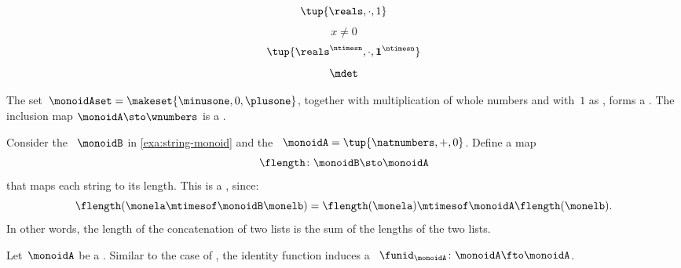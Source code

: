 {\begin{forslides}
\begin{equation}
        \end{equation}
        \begin{equation}
            \label{eq:reals-times-one}
            \tup{\reals, \cdot, 1}
        \end{equation}
        \begin{equation}
            \label{eq:reals-times-one-non}
            x \neq 0
        \end{equation}
        \begin{equation}
            \label{eq:matrices-times}
            \tup{\reals^{\ntimesn}, \cdot, \mathbf{1}^{\ntimesn}}
        \end{equation}
        \begin{equation}
            \label{eq:det}
            \mdet
        \end{equation}
    \end{forslides}
}%

\begin{example}
    The set~$\monoidAset = \makeset{ \minusone, 0, \plusone }$, together with multiplication of whole numbers and with~$1$ as , forms a .
    The inclusion map $\monoidA \sto \wnumbers$ is a .
\end{example}

\begin{example}
    \label{exa:string-length}
    Consider the ~$\monoidB$ in \cref{exa:string-monoid} and the ~$\monoidA=\tup{\natnumbers, +,0}$.
    Define a map
    \begin{equation}
        \flength \colon \monoidB \sto \monoidA
    \end{equation}
    that maps each string to its length.
    This is a , since:
    \begin{equation}
        \flength(\monela \mtimesof\monoidB \monelb)=\flength(\monela)\mtimesof\monoidA \flength(\monelb).
    \end{equation}
    In other words, the length of the concatenation of two lists is the sum of the lengths of the two lists.
\end{example}

\begin{ctdefinition}
    \label{def:identity-mon-mor}
    Let~$\monoidA$ be a .
    Similar to the case of , the identity function induces a ~$\funid_\monoidA\colon \monoidA \fto \monoidA$.
\end{ctdefinition}

